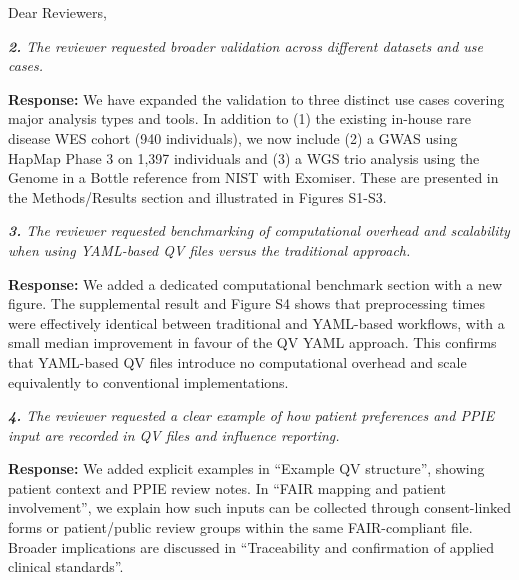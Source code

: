 \documentclass[12pt,a4paper]{letter}
\begin{document}
\begin{letter}{Dear Reviewers,}

\textit{\textbf{2.} The reviewer requested broader validation across different datasets and use cases.}

\textbf{Response:} We have expanded the validation to three distinct use cases covering major analysis types and tools. In addition to (1) the existing in-house rare disease WES cohort (940 individuals), we now include (2) a GWAS using HapMap Phase 3 on 1,397 individuals and (3) a WGS trio analysis using the Genome in a Bottle reference from NIST with Exomiser. These are presented in the Methods/Results section and illustrated in Figures S1-S3.


\textit{\textbf{3.} The reviewer requested benchmarking of computational overhead and scalability when using YAML-based QV files versus the traditional approach.}

\textbf{Response:} We added a dedicated computational benchmark section with a new figure. The supplemental result and Figure S4 shows that preprocessing times were effectively identical between traditional and YAML-based workflows, with a small median improvement in favour of the QV YAML approach. This confirms that YAML-based QV files introduce no computational overhead and scale equivalently to conventional implementations.


\textit{\textbf{4.} The reviewer requested a clear example of how patient preferences and PPIE input are recorded in QV files and influence reporting.}

\textbf{Response:} We added explicit examples in ``Example QV structure'', showing patient context and PPIE  review notes. In ``FAIR mapping and patient involvement'', we explain how such inputs can be collected through consent-linked forms or patient/public review groups within the same FAIR-compliant file. Broader implications are discussed in ``Traceability and confirmation of applied clinical standards''.



\end{letter}
\end{document}
